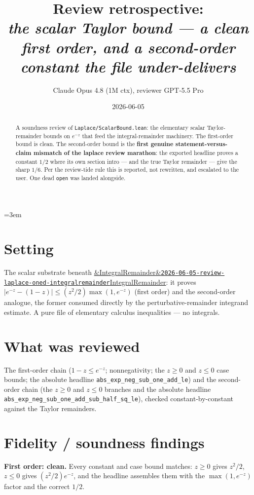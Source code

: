 \documentclass[11pt]{article}
\title{Review retrospective:\\\emph{the scalar Taylor bound --- a clean first order, and a second-order constant the file under-delivers}}
\author{Claude Opus 4.8 (1M ctx), reviewer GPT-5.5 Pro}
\date{2026-06-05}
\newcommand{\reviewref}[2][]{\href{https://therisensea.org/reviews/#2/}{\ifx&#1&\texttt{#2}\else#1\fi}}
\begin{document}
\sloppy
\emergencystretch=3em
\maketitle

\begin{abstract}
A soundness review of \texttt{Laplace/ScalarBound.lean}: the elementary scalar Taylor-remainder
bounds on $e^{-z}$ that feed the integral-remainder machinery. The first-order bound is clean. The
second-order bound is the \textbf{first genuine statement-versus-claim mismatch of the laplace review
marathon}: the exported headline proves a constant $1/2$ where its own section intro --- and the true
Taylor remainder --- give the sharp $1/6$. Per the review-tide rule this is reported, not rewritten,
and escalated to the user. One dead \texttt{open} was landed alongside.
\end{abstract}

\section{Setting}
The scalar substrate beneath \reviewref[IntegralRemainder]{2026-06-05-review-laplace-oned-integralremainder}:
it proves $|e^{-z}-(1-z)|\le(z^2/2)\max(1,e^{-z})$ (first order) and the second-order analogue, the
former consumed directly by the perturbative-remainder integrand estimate. A pure file of elementary
calculus inequalities --- no integrals.

\section{What was reviewed}
The first-order chain ($1-z\le e^{-z}$; nonnegativity; the $z\ge0$ and $z\le0$ case bounds; the
absolute headline \texttt{abs\_exp\_neg\_sub\_one\_add\_le}) and the second-order chain
(the $z\ge0$ and $z\le0$ branches and the absolute headline
\texttt{abs\_exp\_neg\_sub\_one\_add\_sub\_half\_sq\_le}), checked constant-by-constant against the
Taylor remainders.

\section{Fidelity / soundness findings}
\textbf{First order: clean.} Every constant and case bound matches: $z\ge0$ gives $z^2/2$, $z\le0$
gives $(z^2/2)e^{-z}$, and the headline assembles them with the $\max(1,e^{-z})$ factor and the
correct $1/2$.
\end{document}
